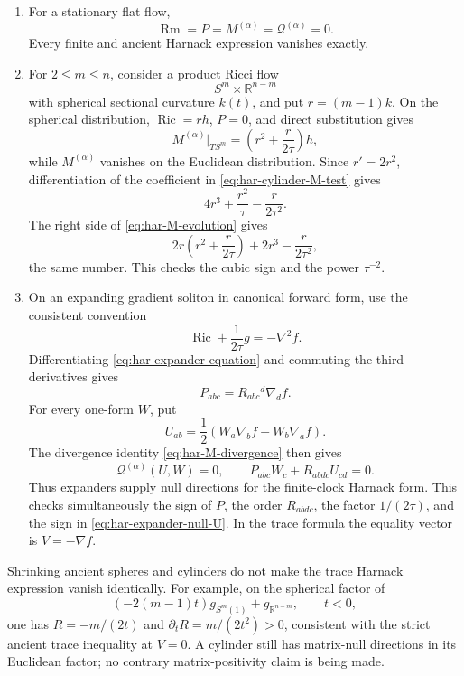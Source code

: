 \documentclass[10pt]{coll-l}
\theoremstyle{definition}
\theoremstyle{remark}
\numberwithin{section}{chapter}
\numberwithin{equation}{chapter}
\newcommand{\Ric}{\operatorname{Ric}}
\newcommand{\Rm}{\operatorname{Rm}}
\begin{document}
\begin{enumerate}
\item For a stationary flat flow,
\[
     \Rm=P=M^{(\alpha)}=\mathscr Q^{(\alpha)}=0.
\]
Every finite and ancient Harnack expression vanishes exactly.

\item For $2\leq m\leq n$, consider a product Ricci flow
\[
 S^m\times\mathbb R^{n-m}
\]
with spherical sectional curvature $k(t)$, and put $r=(m-1)k$.  On the
spherical distribution, $\Ric=rh$, $P=0$, and direct substitution gives
\begin{equation}
 M^{(\alpha)}\big|_{TS^m}
     =\left(r^2+\frac r{2\tau}\right)h,                 \label{eq:har-cylinder-M-test}
\end{equation}
while $M^{(\alpha)}$ vanishes on the Euclidean distribution.  Since
$r'=2r^2$, differentiation of the coefficient in
\eqref{eq:har-cylinder-M-test} gives
\[
 4r^3+\frac{r^2}{\tau}-\frac r{2\tau^2}.
\]
The right side of \eqref{eq:har-M-evolution} gives
\[
 2r\left(r^2+\frac r{2\tau}\right)+2r^3
                       -\frac r{2\tau^2},
\]
the same number.  This checks the cubic sign and the power $\tau^{-2}$.

\item On an expanding gradient soliton in canonical forward form, use the
consistent convention
\begin{equation}
       \Ric+\frac1{2\tau}g=-\nabla^2f.                  \label{eq:har-expander-equation}
\end{equation}
Differentiating \eqref{eq:har-expander-equation} and commuting the third
derivatives gives
\[
             P_{abc}=R_{abc}{}^d\nabla_df.
\]
For every one-form $W$, put
\begin{equation}
       U_{ab}=\frac12(W_a\nabla_bf-W_b\nabla_af).        \label{eq:har-expander-null-U}
\end{equation}
The divergence identity \eqref{eq:har-M-divergence} then gives
\[
 \mathscr Q^{(\alpha)}(U,W)=0,
 \qquad
 P_{abc}W_c+R_{abdc}U_{cd}=0.
\]
Thus expanders supply null directions for the finite-clock Harnack form.
This checks simultaneously the sign of $P$, the order $R_{abdc}$, the
factor $1/(2\tau)$, and the sign in
\eqref{eq:har-expander-null-U}.  In the trace formula the equality vector is
$V=-\nabla f$.
\end{enumerate}

Shrinking ancient spheres and cylinders do not make the trace Harnack
expression vanish identically.  For example, on the spherical factor of
\[
       (-2(m-1)t)g_{S^m(1)}+g_{\mathbb R^{n-m}},\qquad t<0,
\]
one has $R=-m/(2t)$ and $\partial_tR=m/(2t^2)>0$, consistent with the strict
ancient trace inequality at $V=0$.  A cylinder still has matrix-null
directions in its Euclidean factor; no contrary matrix-positivity claim is
being made.
\end{document}
